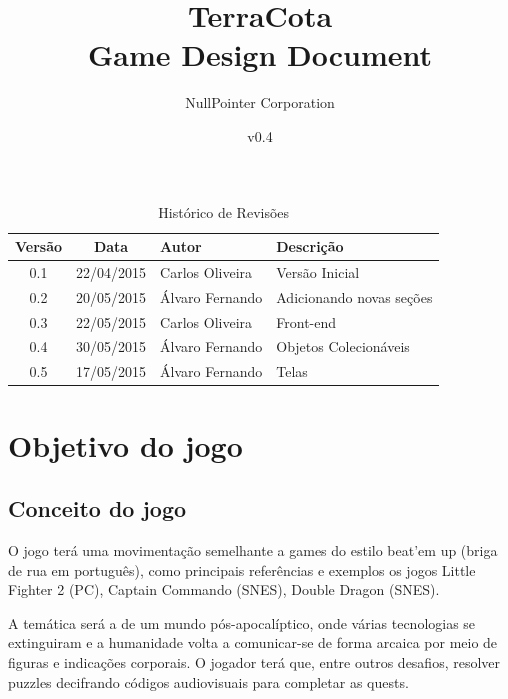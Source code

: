 \documentclass[12pt]{article}
\begin{document}
\title{TerraCota\\Game Design Document}
\author{NullPointer Corporation}
\date{v0.4}
\maketitle

\newpage

\begin{table}[h]
  \centering
  \begin{tabular}{ccll}
    \toprule
    \textbf{Versão} & \textbf{Data} & \textbf{Autor} & \textbf{Descrição} \\
    \midrule
    0.1 & 22/04/2015 & Carlos Oliveira  & Versão Inicial \\
    \rowcolor[gray]{0.9}
    0.2 & 20/05/2015 & Álvaro Fernando & Adicionando novas seções \\
    0.3 & 22/05/2015 & Carlos Oliveira & Front-end \\
    \rowcolor[gray]{0.9}
    0.4 & 30/05/2015 & Álvaro Fernando & Objetos Colecionáveis \\
    0.5 & 17/05/2015 & Álvaro Fernando & Telas \\
    \bottomrule
  \end{tabular}
  \caption{Histórico de Revisões}
\end{table}

\newpage

\tableofcontents

\newpage

\listoffigures

\newpage
\section{Objetivo do jogo}

\subsection{Conceito do jogo}
O jogo terá uma movimentação semelhante a games do estilo beat'em up (briga de
rua em português), como principais referências e exemplos os jogos Little
Fighter 2 (PC), Captain Commando (SNES), Double Dragon (SNES).

A temática será a de um mundo pós-apocalíptico, onde várias tecnologias se
extinguiram e a humanidade volta a comunicar-se de forma arcaica por meio de
figuras e indicações corporais. O jogador terá que, entre outros desafios,
resolver puzzles decifrando códigos audiovisuais para completar as quests.
\end{document}
